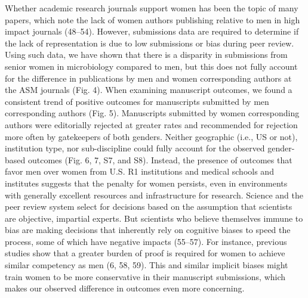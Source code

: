 \documentclass[11pt,]{article}
\begin{document}
Whether academic research journals support women has been the topic of
many papers, which note the lack of women authors publishing relative to
men in high impact journals (48--54). However, submissions data are
required to determine if the lack of representation is due to low
submissions or bias during peer review. Using such data, we have shown
that there is a disparity in submissions from senior women in
microbiology compared to men, but this does not fully account for the
difference in publications by men and women corresponding authors at the
ASM journals (Fig. 4). When examining manuscript outcomes, we found a
consistent trend of positive outcomes for manuscripts submitted by men
corresponding authors (Fig. 5). Manuscripts submitted by women
corresponding authors were editorially rejected at greater rates and
recommended for rejection more often by gatekeepers of both genders.
Neither geographic (i.e., US or not), institution type, nor
sub-discipline could fully account for the observed gender-based
outcomes (Fig. 6, 7, S7, and S8). Instead, the presence of outcomes that
favor men over women from U.S. R1 institutions and medical schools and
institutes suggests that the penalty for women persists, even in
environments with generally excellent resources and infrastructure for
research. Science and the peer review system select for decisions based
on the assumption that scientists are objective, impartial experts. But
scientists who believe themselves immune to bias are making decisions
that inherently rely on cognitive biases to speed the process, some of
which have negative impacts (55--57). For instance, previous studies
show that a greater burden of proof is required for women to achieve
similar competency as men (6, 58, 59). This and similar implicit biases
might train women to be more conservative in their manuscript
submissions, which makes our observed difference in outcomes even more
concerning.
\end{document}

